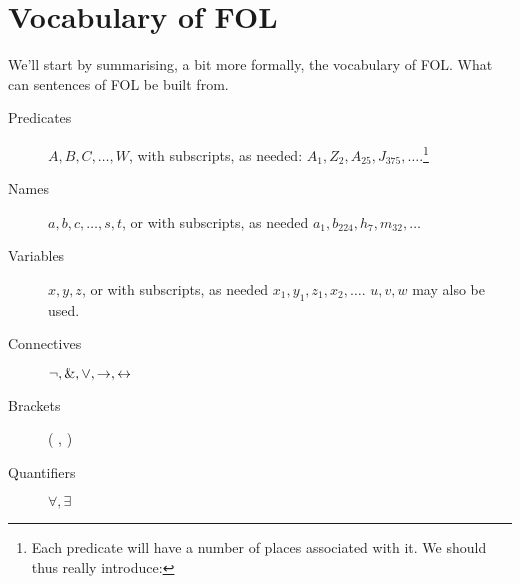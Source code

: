 
\section{Vocabulary of FOL}
We'll start by summarising, a bit more formally, the vocabulary of FOL. What can sentences of FOL be built from. 

\begin{description}
\item[Predicates] $A,B,C,\ldots,W$,
with subscripts, as needed: $A_1, Z_2,A_{25},J_{375},\ldots$.\footnote{Each predicate will have a number of places associated with it. We should thus really introduce:}
\item[Names] $a,b,c,\ldots, s, t$, or
with subscripts, as needed $a_1, b_{224}, h_7, m_{32},\ldots$
\item[Variables] $x,y,z$, or
with subscripts, as needed $x_1, y_1, z_1, x_2,\ldots$. $u,v,w$ may also be used. 
\item[Connectives]  $\neg,\mathbin{\&},\vee,\rightarrow,\leftrightarrow$
\item[Brackets] ( , )
\item[Quantifiers]  $\forall, \exists$
\end{description}

